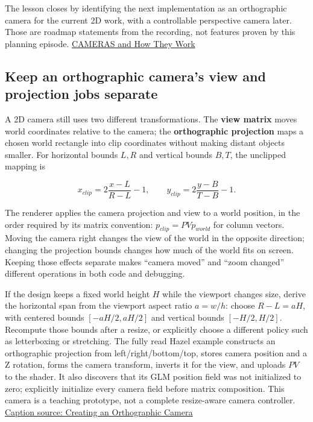 The lesson closes by identifying the next implementation as an orthographic camera for the current 2D work, with a controllable perspective camera later. Those are roadmap statements from the recording, not features proven by this planning episode. \href{https://www.youtube.com/watch?v=LfbqtmqxX04&t=2220s}{CAMERAS and How They Work}

\subsection{Keep an orthographic camera's view and projection jobs separate}\label{06-engine-ii-ch026-keep-an-orthographic-cameras-view-and-projection-jobs-separate}

A 2D camera still uses two different transformations. The \textbf{view matrix} moves world coordinates relative to the camera; the \textbf{orthographic projection} maps a chosen world rectangle into clip coordinates without making distant objects smaller. For horizontal bounds \(L,R\) and vertical bounds \(B,T\), the unclipped mapping is

\[
x_{clip}=2\frac{x-L}{R-L}-1,\qquad y_{clip}=2\frac{y-B}{T-B}-1.
\]

The renderer applies the camera projection and view to a world position, in the order required by its matrix convention: \(p_{clip}=P V p_{world}\) for column vectors. Moving the camera right changes the view of the world in the opposite direction; changing the projection bounds changes how much of the world fits on screen. Keeping those effects separate makes ``camera moved'' and ``zoom changed'' different operations in both code and debugging.

If the design keeps a fixed world height \(H\) while the viewport changes size, derive the horizontal span from the viewport aspect ratio \(a=w/h\): choose \(R-L=aH\), with centered bounds \([-aH/2,aH/2]\) and vertical bounds \([-H/2,H/2]\). Recompute those bounds after a resize, or explicitly choose a different policy such as letterboxing or stretching. The fully read Hazel example constructs an orthographic projection from left/right/bottom/top, stores camera position and a Z rotation, forms the camera transform, inverts it for the view, and uploads \(PV\) to the shader. It also discovers that its GLM position field was not initialized to zero; explicitly initialize every camera field before matrix composition. This camera is a teaching prototype, not a complete resize-aware camera controller. \href{https://www.youtube.com/watch?v=NjKv-HWstxA}{Caption source: Creating an Orthographic Camera}

